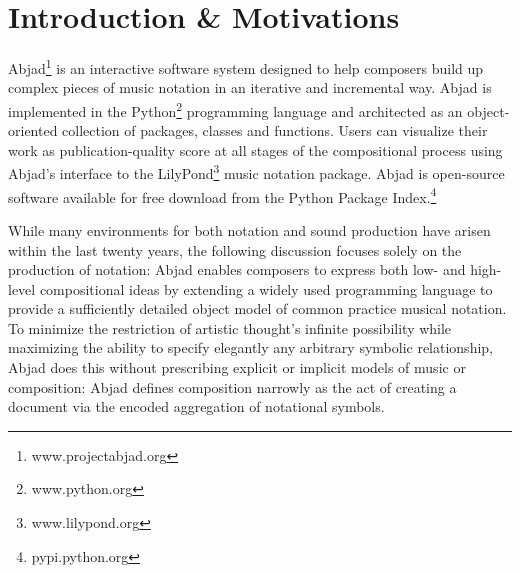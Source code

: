 \section{Introduction \& Motivations}\label{sec:introduction}

\begin{comment}
1. Changed "composers, music theorists and musicologists" to just "composers".
How do we feel about this?
\end{comment}

Abjad\footnote{www.projectabjad.org} is an interactive software system designed
to help composers build up complex pieces of music notation in an iterative and
incremental way. Abjad is implemented in the Python\footnote{www.python.org}
programming language and architected as an object-oriented collection of
packages, classes and functions. Users can visualize their work as
publication-quality score at all stages of the compositional process using
Abjad's interface to the LilyPond\footnote{www.lilypond.org} music notation
package. Abjad is open-source software available for free download from the
Python Package Index.\footnote{pypi.python.org}

While many environments for both notation and sound production have arisen
within the last twenty years, the following discussion focuses solely on the
production of notation: Abjad enables composers to express both low- and
high-level compositional ideas by extending a widely used programming language
to provide a sufficiently detailed object model of common practice musical
notation. To minimize the restriction of artistic thought's infinite
possibility while maximizing the ability to specify elegantly any arbitrary
symbolic relationship, Abjad does this without prescribing explicit or implicit
models of music or composition: Abjad defines composition narrowly as the act
of creating a document via the encoded aggregation of notational symbols.

\begin{comment}
The current version of Abjad implements 491 public classes and 324 public
functions.
\end{comment}